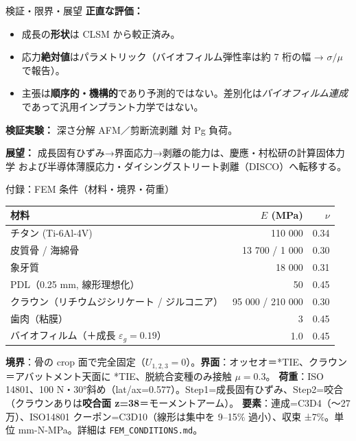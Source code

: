 \documentclass[
  ignorenonframetext,
  aspectratio=169,
]{beamer}
\providecommand{\tightlist}{%
  \setlength{\itemsep}{0pt}\setlength{\parskip}{0pt}}
\begin{document}
\begin{frame}{検証・限界・展望}
\protect\hypertarget{ux691cux8a3cux9650ux754cux5c55ux671b}{}
\textbf{正直な評価：}

\begin{itemize}
\tightlist
\item
  成長の\textbf{形状}は CLSM から較正済み。
\item
  応力\textbf{絶対値}はパラメトリック（バイオフィルム弾性率は約 7 桁の幅
  → \(\sigma/\mu\) で報告）。
\item
  主張は\textbf{順序的・機構的}であり予測的ではない。差別化は\emph{バイオフィルム連成}
  であって汎用インプラント力学ではない。
\end{itemize}

\textbf{検証実験：} 深さ分解 AFM／剪断流剥離 対 Pg 負荷。

\vspace{0.3em}

\textbf{展望：}
成長固有ひずみ→界面応力→剥離の能力は、慶應・村松研の計算固体力学
および半導体薄膜応力・ダイシングストリート剥離（DISCO）へ転移する。
\end{frame}

\begin{frame}[fragile]{付録：FEM 条件（材料・境界・荷重）}
\protect\hypertarget{ux4ed8ux9332fem-ux6761ux4ef6ux6750ux6599ux5883ux754cux8377ux91cd}{}
\begin{longtable}[]{@{}lrr@{}}
\toprule
材料 & \(E\) (MPa) & \(\nu\) \\
\midrule
\endhead
チタン (Ti-6Al-4V) & 110 000 & 0.34 \\
皮質骨 / 海綿骨 & 13 700 / 1 000 & 0.30 \\
象牙質 & 18 000 & 0.31 \\
PDL（0.25 mm, 線形理想化） & 50 & 0.45 \\
クラウン（リチウムジシリケート / ジルコニア） & 95 000 / 210 000 &
0.30 \\
歯肉（粘膜） & 3 & 0.45 \\
バイオフィルム（＋成長 \(\varepsilon_g=0.19\)） & 1.0 & 0.45 \\
\bottomrule
\end{longtable}

\textbf{境界}：骨の crop
面で完全固定（\(U_{1,2,3}=0\)）。\textbf{界面}：オッセオ＝*TIE、クラウン＝アバットメント天面に
*TIE、脱統合変種のみ接触 \(\mu=0.3\)。 \textbf{荷重}：ISO 14801、100
N・30°斜め（lat/ax=0.577）。Step1=成長固有ひずみ、Step2=咬合（クラウンありは\textbf{咬合面
z=38}＝モーメントアーム）。 \textbf{要素}：連成=C3D4（〜27万）、ISO14801
クーポン=C3D10（線形は集中を 9--15\% 過小）、収束 ±7\%。単位
mm-N-MPa。詳細は \texttt{FEM\_CONDITIONS.md}。
\end{frame}
\end{document}
